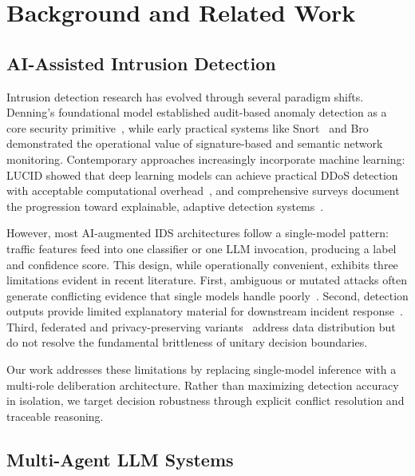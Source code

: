 
\section{Background and Related Work}
\label{sec:related-work}

\subsection{AI-Assisted Intrusion Detection}
\label{subsec:ai-ids}

Intrusion detection research has evolved through several paradigm shifts. Denning's foundational model established audit-based anomaly detection as a core security primitive~\cite{denning1987intrusion}, while early practical systems like Snort~\cite{roesch1999snort} and Bro~\cite{paxson1999bro} demonstrated the operational value of signature-based and semantic network monitoring. Contemporary approaches increasingly incorporate machine learning: LUCID showed that deep learning models can achieve practical DDoS detection with acceptable computational overhead~\cite{doriguzzi2020lucid}, and comprehensive surveys document the progression toward explainable, adaptive detection systems~\cite{neupane2022xids,holdbrook2024survey}.

However, most AI-augmented IDS architectures follow a single-model pattern: traffic features feed into one classifier or one LLM invocation, producing a label and confidence score. This design, while operationally convenient, exhibits three limitations evident in recent literature. First, ambiguous or mutated attacks often generate conflicting evidence that single models handle poorly~\cite{neupane2022xids}. Second, detection outputs provide limited explanatory material for downstream incident response~\cite{hermosilla2025systems}. Third, federated and privacy-preserving variants~\cite{buyuktanir2025federated} address data distribution but do not resolve the fundamental brittleness of unitary decision boundaries.

Our work addresses these limitations by replacing single-model inference with a multi-role deliberation architecture. Rather than maximizing detection accuracy in isolation, we target decision robustness through explicit conflict resolution and traceable reasoning.

\subsection{Multi-Agent LLM Systems}
\label{subsec:multi-agent}

